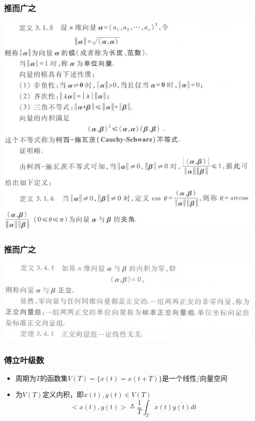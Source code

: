 \documentclass[CJKutf8,xcolor=pdftex,dvipsnames,table]{beamer}
\begin{document}
\begin{CJK*}{UTF8}{song}
  \begin{frame}
    \frametitle{推而广之}
    \begin{center}
      \includegraphics[scale=.35]{cqu-la-def-3-1-5}

    \end{center}
  \end{frame}   


  \begin{frame}
    \frametitle{推而广之}
    \begin{center}
      \includegraphics[scale=.5]{cqu-la-def-3-4-1}

    \end{center}
  \end{frame}   

  
  \begin{frame}
    \frametitle{傅立叶级数}
    \begin{itemize}
	\item 周期为$T$的函数集$V(T)=\{x(t)=x(t+T)\}$是一个线性/向量空间
	\item 为$V(T)$定义内积，即$x(t), y(t) \in V(T)$
	\[ 
	<x(t), y(t)> \triangleq \frac{1}{T}\int_T x(t) \overline{y(t)} dt
	\]
	

\end{itemize}
\end{frame}
\end{CJK*}
\end{document}
